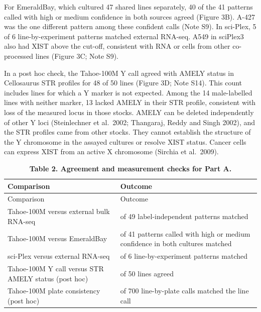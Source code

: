 \documentclass[
  11pt,
  letterpaper,
]{article}
\begin{document}
For EmeraldBay, which cultured 47 shared lines separately, 40 of the 41
patterns called with high or medium confidence in both sources agreed
(Figure 3B). A-427 was the one different pattern among these confident
calls (Note S9). In sci-Plex, 5 of 6 line-by-experiment patterns matched
external RNA-seq. A549 in sciPlex3 also had XIST above the cut-off,
consistent with RNA or cells from other co-processed lines (Figure 3C;
Note S9).

In a post hoc check, the Tahoe-100M Y call agreed with AMELY status in
Cellosaurus STR profiles for 48 of 50 lines (Figure 3D; Note S14). This
count includes lines for which a Y marker is not expected. Among the 14
male-labelled lines with neither marker, 13 lacked AMELY in their STR
profile, consistent with loss of the measured locus in those stocks.
AMELY can be deleted independently of other Y loci (Steinlechner et
al.~2002; Thangaraj, Reddy and Singh 2002), and the STR profiles came
from other stocks. They cannot establish the structure of the Y
chromosome in the assayed cultures or resolve XIST status. Cancer cells
can express XIST from an active X chromosome (Sirchia et al.~2009).

\begin{longtable}[]{@{}
  >{\raggedright\arraybackslash}p{}
  >{\raggedright\arraybackslash}p{}@{}}
\caption{\textbf{Table 2. Agreement and measurement checks for Part
A.}}\tabularnewline
\toprule\noalign{}
\begin{minipage}[b]{\linewidth}\raggedright
Comparison
\end{minipage} & \begin{minipage}[b]{\linewidth}\raggedright
Outcome
\end{minipage} \\
\midrule\noalign{}
\endfirsthead
\toprule\noalign{}
\begin{minipage}[b]{\linewidth}\raggedright
Comparison
\end{minipage} & \begin{minipage}[b]{\linewidth}\raggedright
Outcome
\end{minipage} \\
\midrule\noalign{}
\endhead
\bottomrule\noalign{}
\endlastfoot
Tahoe-100M versus external bulk RNA-seq & 47 of 49 label-independent
patterns matched \\
Tahoe-100M versus EmeraldBay & 40 of 41 patterns called with high or
medium confidence in both cultures matched \\
sci-Plex versus external RNA-seq & 5 of 6 line-by-experiment patterns
matched \\
Tahoe-100M Y call versus STR AMELY status (post hoc) & 48 of 50 lines
agreed \\
Tahoe-100M plate consistency (post hoc) & 685 of 700 line-by-plate calls
matched the line call \\
\end{longtable}
\end{document}
